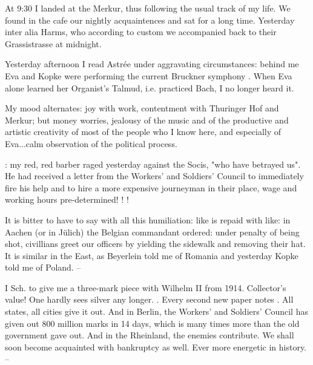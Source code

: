 At 9:30 I landed at the Merkur, thus following the usual track of my life. We found in the cafe our nightly acquaintences and sat for a long time. Yesterday inter alia Harms, who according to custom we accompanied back to their Grassistrasse at midnight.

\missing Yesterday afternoon I read Astrée under aggravating circumstances: behind me Eva and Kopke were performing the current Bruckner symphony . When Eva alone learned her Organist's Talmud, i.e. practiced Bach, I no longer heard it.

My mood alternates: joy with work, contentment with Thuringer Hof and Merkur; but money worries, jealousy of the music and of the productive and artistic creativity of most of the people who I know here, and especially of Eva...calm observation of the political process.

: my red, red barber raged yesterday against the Socis, "who have betrayed us". He had received a letter from the Workers' and Soldiers' Council to immediately fire his help and to hire a more expensive journeyman in their place, wage and working hours pre-determined! ! !

\missing

It is bitter to have to say with all this humiliation: like is repaid with like: in Aachen (or in Jülich) the Belgian commandant ordered: under penalty of being shot, civillians greet our officers by yielding the sidewalk and removing their hat. It is similar in the East, as Beyerlein told me of Romania and yesterday Kopke told me of Poland. --

\missing

I  Sch. to give me a three-mark piece with Wilhelm II from 1914. Collector's value! One hardly sees silver any longer. \missing. Every second new paper notes . All states, all cities give it out. And in Berlin, the Workers' and Soldiers' Council has given out 800 million marks in 14 days, which is many times more than the old government gave out. And in the Rheinland, the enemies contribute. We shall soon become acquainted with bankruptcy as well. Ever more energetic  in history. --



